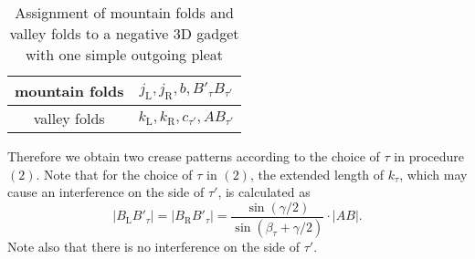 \documentclass[11pt]{amsart}
\numberwithin{equation}{section}
\numberwithin{theorem}{section}
\newcommand{\Lt}{\ensuremath{\mathrm{L}}}
\newcommand{\Rt}{\ensuremath{\mathrm{R}}}
\newcommand{\norm}[1]{\ensuremath{\left| #1 \right|}}
\begin{document}
\renewcommand{\arraystretch}{1.5}
\addtocounter{theorem}{1}
\begin{table}[h]
\begin{tabular}{c|c}
mountain folds&$j_\Lt ,j_\Rt ,b,B'_\tau B_{\tau'}$\\ \hline
valley folds&$k_\Lt ,k_\Rt ,c_{\tau'},AB_{\tau'}$
\end{tabular}\vspace{0.5cm}
\caption{Assignment of mountain folds and valley folds to a negative $3$D gadget with one simple outgoing pleat}
\label{tbl:assignment_negative_onepleat}
\end{table}
Therefore we obtain two crease patterns according to the choice of $\tau$ in procedure $(2)$.
Note that for the choice of $\tau$ in $(2)$, the extended length of $k_\tau$, which may cause an interference on the side of $\tau'$, is calculated as
\begin{equation*}
\norm{B_\Lt B'_\tau}=\norm{B_\Rt B'_\tau}=\frac{\sin (\gamma /2)}{\sin (\beta_\tau +\gamma /2)}\cdot\norm{AB}.
\end{equation*}
Note also that there is no interference on the side of $\tau'$.
\end{document}
